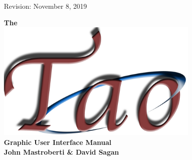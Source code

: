 \thispagestyle{empty}

\begin{flushright}
\large
Revision: November 8, 2019 \\
\end{flushright}

\vfill


{
\begin{center}
{\Huge \sf\bf The} \\
\vskip 0.1in
\includegraphics[width=10cm]{tao-logo.pdf} \\
\vskip 0.1in
{\Huge \sf\bf Graphic User Interface Manual} \\
\vskip 0.4in
{\huge \sf\bf John Mastroberti \& David Sagan} \\
\end{center}
}

\vfill
\break
